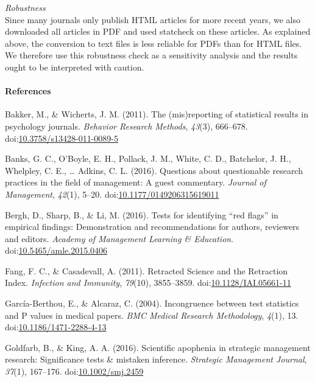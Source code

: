 \documentclass[english,man]{apa6}
\newcounter{author}
\begin{document}
\emph{Robustness}\\Since many journals only publish HTML articles for
more recent years, we also downloaded all articles in PDF and used
statcheck on these articles. As explained above, the conversion to text
files is less reliable for PDFs than for HTML files. We therefore use
this robustness check as a sensitivity analysis and the results ought to
be interpreted with caution.

\paragraph*{References}\label{references}

Bakker, M., \& Wicherts, J. M. (2011). The (mis)reporting of statistical
results in psychology journals. \emph{Behavior Research Methods},
\emph{43}(3), 666--678.
doi:\href{http://dx.doi.org/10.3758/s13428-011-0089-5}{10.3758/s13428-011-0089-5}

Banks, G. C., O'Boyle, E. H., Pollack, J. M., White, C. D., Batchelor,
J. H., Whelpley, C. E., \ldots{} Adkins, C. L. (2016). Questions about
questionable research practices in the field of management: A guest
commentary. \emph{Journal of Management}, \emph{42}(1), 5--20.
doi:\href{http://dx.doi.org/10.1177/0149206315619011}{10.1177/0149206315619011}

Bergh, D., Sharp, B., \& Li, M. (2016). Tests for identifying ``red
flags'' in empirical findings: Demonstration and recommendations for
authors, reviewers and editors. \emph{Academy of Management Learning \&
Education}.
doi:\href{http://dx.doi.org/10.5465/amle.2015.0406}{10.5465/amle.2015.0406}

Fang, F. C., \& Casadevall, A. (2011). Retracted Science and the
Retraction Index. \emph{Infection and Immunity}, \emph{79}(10),
3855--3859.
doi:\href{http://dx.doi.org/10.1128/IAI.05661-11}{10.1128/IAI.05661-11}

Garc{í}a-Berthou, E., \& Alcaraz, C. (2004). Incongruence between test
statistics and P values in medical papers. \emph{BMC Medical Research
Methodology}, \emph{4}(1), 13.
doi:\href{http://dx.doi.org/10.1186/1471-2288-4-13}{10.1186/1471-2288-4-13}

Goldfarb, B., \& King, A. A. (2016). Scientific apophenia in strategic
management research: Significance tests \& mistaken inference.
\emph{Strategic Management Journal}, \emph{37}(1), 167--176.
doi:\href{http://dx.doi.org/10.1002/smj.2459}{10.1002/smj.2459}
\end{document}
